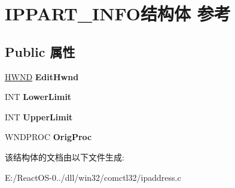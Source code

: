 \hypertarget{struct_i_p_p_a_r_t___i_n_f_o}{}\section{I\+P\+P\+A\+R\+T\+\_\+\+I\+N\+F\+O结构体 参考}
\label{struct_i_p_p_a_r_t___i_n_f_o}
\subsection*{Public 属性}
\begin{DoxyCompactItemize}
\item 
\mbox{\label{struct_i_p_p_a_r_t___i_n_f_o_a5095b520a13e74254d4caf45e780a5ae}} 
\hyperlink{interfacevoid}{H\+W\+ND} {\bfseries Edit\+Hwnd}
\item 
\mbox{\label{struct_i_p_p_a_r_t___i_n_f_o_a8dd2e29b49c52b899c4a9db68dd6781f}} 
I\+NT {\bfseries Lower\+Limit}
\item 
\mbox{\label{struct_i_p_p_a_r_t___i_n_f_o_a438e91ab831b7dbbe156d7f82d2277c6}} 
I\+NT {\bfseries Upper\+Limit}
\item 
\mbox{\label{struct_i_p_p_a_r_t___i_n_f_o_a83a3d389f152992f3bffd07978f36f1d}} 
W\+N\+D\+P\+R\+OC {\bfseries Orig\+Proc}
\end{DoxyCompactItemize}


该结构体的文档由以下文件生成\+:\begin{DoxyCompactItemize}
\item 
E\+:/\+React\+O\+S-\/0../dll/win32/comctl32/ipaddress.\+c\end{DoxyCompactItemize}
